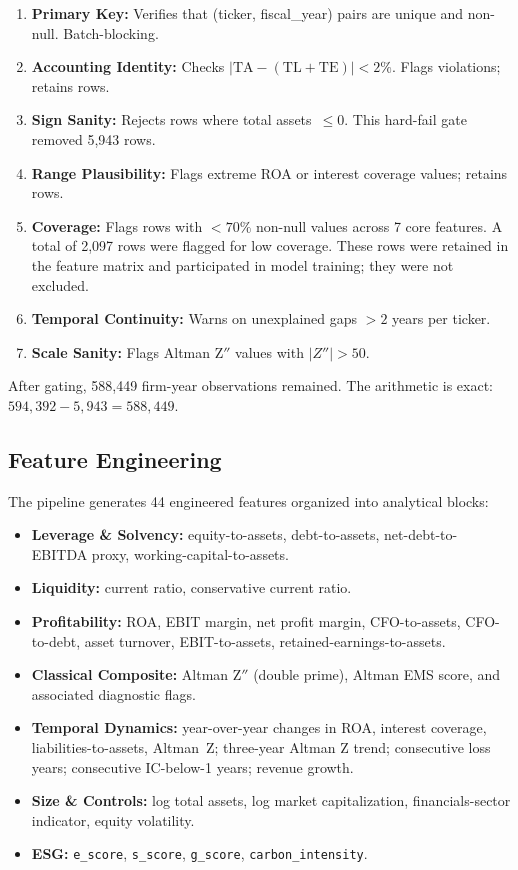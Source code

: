 \documentclass[sigconf,anonymous]{acmart}
\begin{document}
\begin{enumerate}
    \item \textbf{Primary Key:} Verifies that (ticker, fiscal\_year) pairs are unique and non-null. Batch-blocking.
    \item \textbf{Accounting Identity:} Checks $|\text{TA} - (\text{TL} + \text{TE})| < 2\%$. Flags violations; retains rows.
    \item \textbf{Sign Sanity:} Rejects rows where total assets~$\leq 0$. This hard-fail gate removed 5,943 rows.
    \item \textbf{Range Plausibility:} Flags extreme ROA or interest coverage values; retains rows.
    \item \textbf{Coverage:} Flags rows with $< 70\%$ non-null values across 7 core features. A total of 2,097 rows were flagged for low coverage. These rows were retained in the feature matrix and participated in model training; they were not excluded.
    \item \textbf{Temporal Continuity:} Warns on unexplained gaps $> 2$ years per ticker.
    \item \textbf{Scale Sanity:} Flags Altman Z$''$ values with $|Z''| > 50$.
\end{enumerate}

After gating, 588,449 firm-year observations remained. The arithmetic is exact: $594{,}392 - 5{,}943 = 588{,}449$.

\subsection{Feature Engineering}
The pipeline generates 44 engineered features organized into analytical blocks:

\begin{itemize}
    \item \textbf{Leverage \& Solvency:} equity-to-assets, debt-to-assets, net-debt-to-EBITDA proxy, working-capital-to-assets.
    \item \textbf{Liquidity:} current ratio, conservative current ratio.
    \item \textbf{Profitability:} ROA, EBIT margin, net profit margin, CFO-to-assets, CFO-to-debt, asset turnover, EBIT-to-assets, retained-earnings-to-assets.
    \item \textbf{Classical Composite:} Altman Z$''$ (double prime), Altman EMS score, and associated diagnostic flags.
    \item \textbf{Temporal Dynamics:} year-over-year changes in ROA, interest coverage, liabilities-to-assets, Altman~Z; three-year Altman Z trend; consecutive loss years; consecutive IC-below-1 years; revenue growth.
    \item \textbf{Size \& Controls:} log total assets, log market capitalization, financials-sector indicator, equity volatility.
    \item \textbf{ESG:} \texttt{e\_score}, \texttt{s\_score}, \texttt{g\_score}, \texttt{carbon\_intensity}.
\end{itemize}
\end{document}
